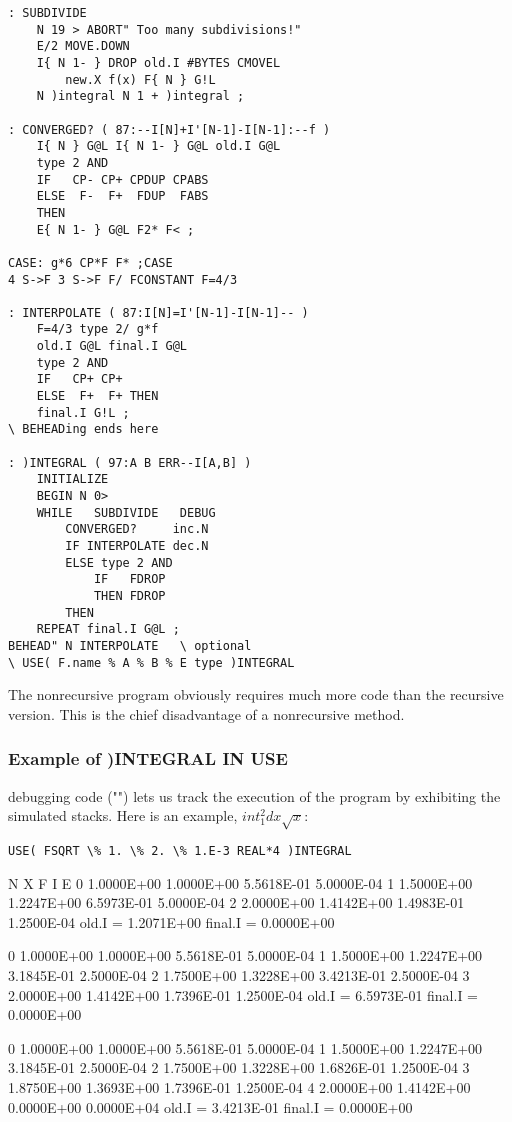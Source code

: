 \begin{lstlisting}
: SUBDIVIDE
    N 19 > ABORT" Too many subdivisions!"
    E/2 MOVE.DOWN
    I{ N 1- } DROP old.I #BYTES CMOVEL
        new.X f(x) F{ N } G!L
    N )integral N 1 + )integral ;

: CONVERGED? ( 87:--I[N]+I'[N-1]-I[N-1]:--f )
    I{ N } G@L I{ N 1- } G@L old.I G@L
    type 2 AND
    IF   CP- CP+ CPDUP CPABS
    ELSE  F-  F+  FDUP  FABS
    THEN
    E{ N 1- } G@L F2* F< ;

CASE: g*6 CP*F F* ;CASE
4 S->F 3 S->F F/ FCONSTANT F=4/3

: INTERPOLATE ( 87:I[N]=I'[N-1]-I[N-1]-- )
    F=4/3 type 2/ g*f
    old.I G@L final.I G@L
    type 2 AND
    IF   CP+ CP+
    ELSE  F+  F+ THEN
    final.I G!L ;
\ BEHEADing ends here

: )INTEGRAL ( 97:A B ERR--I[A,B] )
    INITIALIZE
    BEGIN N 0>
    WHILE   SUBDIVIDE   DEBUG
        CONVERGED?     inc.N
        IF INTERPOLATE dec.N
        ELSE type 2 AND
            IF   FDROP
            THEN FDROP
        THEN
    REPEAT final.I G@L ;
BEHEAD" N INTERPOLATE   \ optional
\ USE( F.name % A % B % E type )INTEGRAL
\end{lstlisting}

The nonrecursive program obviously requires much more code than the recursive version. This is the chief disadvantage of a nonrecursive method.

\subsubsection{Example of )INTEGRAL IN USE}
 debugging code ("") lets us track the execution of the program by exhibiting the simulated stacks. Here is an example, $int_{1}^{2} dx \sqrt{x}$:
\begin{lstlisting}
USE( FSQRT \% 1. \% 2. \% 1.E-3 REAL*4 )INTEGRAL
\end{lstlisting}

N      X            F          I             E
0 1.0000E+00  1.0000E+00 5.5618E-01 5.0000E-04
1 1.5000E+00  1.2247E+00 6.5973E-01 5.0000E-04
2 2.0000E+00  1.4142E+00 1.4983E-01 1.2500E-04
old.I = 1.2071E+00    ﬁnal.I = 0.0000E+00

0 1.0000E+00  1.0000E+00 5.5618E-01 5.0000E-04
1 1.5000E+00  1.2247E+00 3.1845E-01 2.5000E-04
2 1.7500E+00  1.3228E+00 3.4213E-01 2.5000E-04
3 2.0000E+00  1.4142E+00 1.7396E-01 1.2500E-04
old.I = 6.5973E-01  ﬁnal.I = 0.0000E+00

0 1.0000E+00  1.0000E+00 5.5618E-01 5.0000E-04
1 1.5000E+00  1.2247E+00 3.1845E-01 2.5000E-04
2 1.7500E+00  1.3228E+00 1.6826E-01 1.2500E-04
3 1.8750E+00  1.3693E+00 1.7396E-01 1.2500E-04
4 2.0000E+00  1.4142E+00 0.0000E+00 0.0000E+04
old.I = 3.4213E-01  ﬁnal.I = 0.0000E+00

